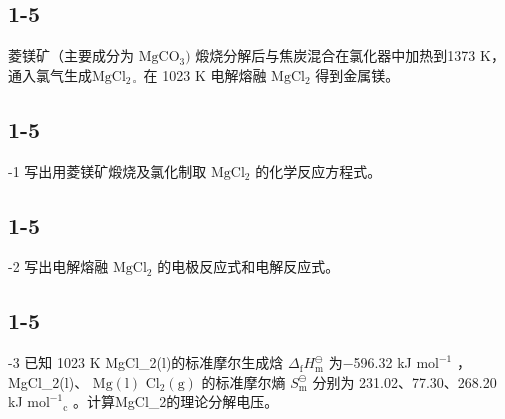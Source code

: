 \subsection*{1-5}
菱镁矿（主要成分为 $\mathrm { M g C O _ { 3 } ) }$ 煅烧分解后与焦炭混合在氯化器中加热到1373 K，通⼊氯⽓⽣成$\mathrm { M g C l _ { 2 \circ } }$ 在 1023 K 电解熔融 $\mathrm { M g C l _ { 2 } }$ 得到⾦属镁。

\subsection*{1-5}
-1 写出⽤菱镁矿煅烧及氯化制取 $\mathrm { M g C l _ { 2 } }$ 的化学反应⽅程式。

\subsection*{1-5}
-2 写出电解熔融 $\mathrm { M g C l _ { 2 } }$ 的电极反应式和电解反应式。

\subsection*{1-5}
-3 已知 1023 K MgCl_{2}(l)的标准摩尔⽣成焓 $\Delta _ { \mathrm { f } } H _ { \mathrm { m } } ^ { \ominus }$ 为−596.32 kJ $\mathrm { m o l ^ { - 1 } }$ ，MgCl_{2}(l)、 $\mathrm { { M g ( l ) } }$ $\mathrm { C l _ { 2 } ( g ) }$ 的标准摩尔熵 $S _ { \mathrm { m } } ^ { \ominus }$ 分别为 231.02、77.30、268.20 kJ $\mathrm { m o l ^ { - 1 } } _ { \mathrm { c } }$ 。计算MgCl_{2}的理论分解电压。
